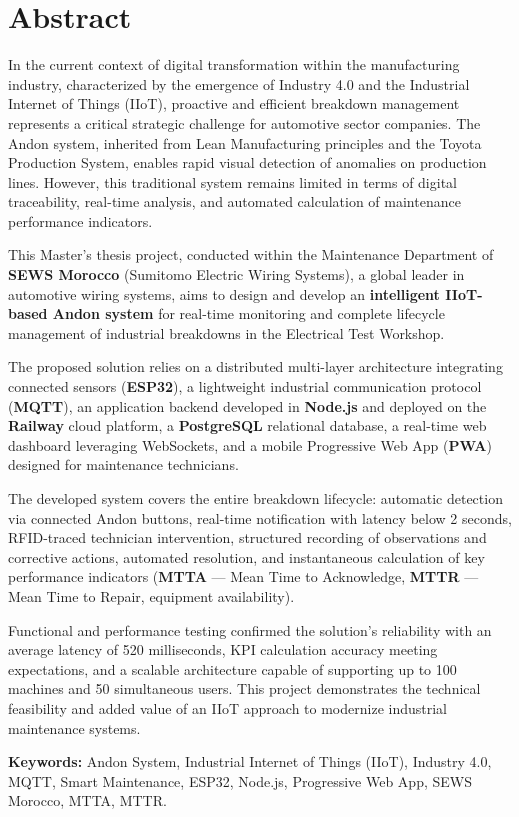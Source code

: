 ﻿%
\chapter*{Abstract}

In the current context of digital transformation within the manufacturing industry, characterized by the emergence of Industry 4.0 and the Industrial Internet of Things (IIoT), proactive and efficient breakdown management represents a critical strategic challenge for automotive sector companies. The Andon system, inherited from Lean Manufacturing principles and the Toyota Production System, enables rapid visual detection of anomalies on production lines. However, this traditional system remains limited in terms of digital traceability, real-time analysis, and automated calculation of maintenance performance indicators.

This Master's thesis project, conducted within the Maintenance Department of \textbf{SEWS Morocco} (Sumitomo Electric Wiring Systems), a global leader in automotive wiring systems, aims to design and develop an \textbf{intelligent IIoT-based Andon system} for real-time monitoring and complete lifecycle management of industrial breakdowns in the Electrical Test Workshop.

The proposed solution relies on a distributed multi-layer architecture integrating connected sensors (\textbf{ESP32}), a lightweight industrial communication protocol (\textbf{MQTT}), an application backend developed in \textbf{Node.js} and deployed on the \textbf{Railway} cloud platform, a \textbf{PostgreSQL} relational database, a real-time web dashboard leveraging WebSockets, and a mobile Progressive Web App (\textbf{PWA}) designed for maintenance technicians.

The developed system covers the entire breakdown lifecycle: automatic detection via connected Andon buttons, real-time notification with latency below 2 seconds, RFID-traced technician intervention, structured recording of observations and corrective actions, automated resolution, and instantaneous calculation of key performance indicators (\textbf{MTTA} --- Mean Time to Acknowledge, \textbf{MTTR} --- Mean Time to Repair, equipment availability).

Functional and performance testing confirmed the solution's reliability with an average latency of 520 milliseconds, KPI calculation accuracy meeting expectations, and a scalable architecture capable of supporting up to 100 machines and 50 simultaneous users. This project demonstrates the technical feasibility and added value of an IIoT approach to modernize industrial maintenance systems.

\vspace{0.5cm}
\noindent\textbf{Keywords:} Andon System, Industrial Internet of Things (IIoT), Industry 4.0, MQTT, Smart Maintenance, ESP32, Node.js, Progressive Web App, SEWS Morocco, MTTA, MTTR.
\clearpage
